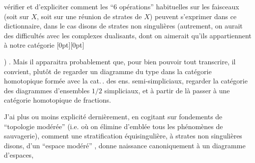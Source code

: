 %
vérifier et d'expliciter comment les ``6 opérations'' habituelles sur les faisceaux (soit sur $X$, soit sur une réunion de strates de $X$) peuvent s'exprimer dans ce dictionnaire, dans le cas disons de strates non singulières (autrement, on aurait des difficultés avec les complexes dualisants, dont on aimerait qu'ils appartiennent à notre catégorie%
\raisebox{-0.45ex}[0pt][0pt]{\parbox{0pt}{}}%
) . Mais il apparaitra probablement que, pour bien pouvoir tout transcrire, il convient, plutôt  de regarder un diagramme du type
dans la catégorie homotopique formée avec la cat.\,. des ens. semi-simpliciaux,  regarder la catégorie des diagrammes d'ensembles $1/2$ simpliciaux, et à partir de là passer à une catégorie homotopique de fractions.

J'ai plus ou moins explicité dernièrement, en cogitant sur  fondements de ``topologie modérée'' (i.e. où on élimine d'emblée tous les phénomènes de sauvagerie), comment une stratification équisingulière, à strates non singulières disons, d'un ``espace modéré'' , donne naissance canoniquement à un diagramme  d'espaces,
